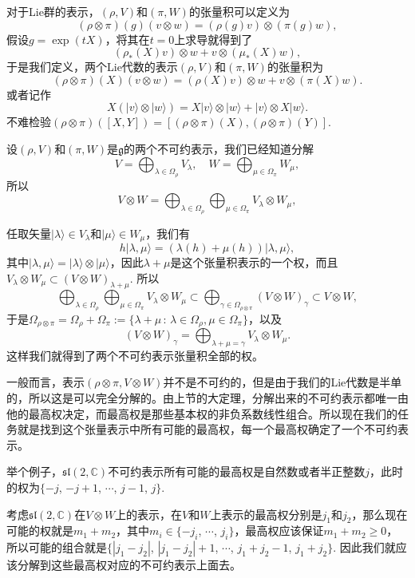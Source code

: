 \documentclass[10pt]{article}
\newcommand{\cc}{\mathbb{C}}
\newcommand{\lag}{{\mathfrak{g}}}
\begin{document}
对于Lie群的表示，$(\rho,V)$和$(\pi,W)$的张量积可以定义为
\[
	(\rho\otimes\pi)(g)(v\otimes w)=(\rho(g)v)\otimes(\pi(g)w),
\]
假设$g=\exp(tX)$，将其在$t=0$上求导就得到了
\[
	(\rho_*(X)v)\otimes w+ v \otimes (\mu_*(X)w),
\]
于是我们定义，两个Lie代数的表示$(\rho,V)$和$(\pi,W)$的张量积为
\[
	(\rho\otimes\pi)(X)(v\otimes w)=(\rho(X)v)\otimes w+ v \otimes (\pi(X)w).
\]
或者记作
\[
	X(|v\rangle\otimes|w\rangle)=X|v\rangle\otimes|w\rangle+|v\rangle\otimes X|w\rangle.
\]
不难检验$(\rho\otimes\pi)([X,Y])=[(\rho\otimes\pi)(X),(\rho\otimes\pi)(Y)]$.

\para 设$(\rho,V)$和$(\pi,W)$是$\lag$的两个不可约表示，我们已经知道分解
\[
	V=\bigoplus_{\lambda\in\Omega_\rho} V_\lambda,\quad W=\bigoplus_{\mu\in\Omega_\pi} W_\mu,
\]
所以
\[
	V\otimes W=\bigoplus_{\lambda\in\Omega_\rho}\bigoplus_{\mu\in\Omega_\pi} V_\lambda\otimes W_\mu,
\]

任取矢量$|\lambda\rangle\in V_\lambda$和$|\mu\rangle\in W_\mu$，我们有
\[
	h|\lambda,\mu\rangle=(\lambda(h)+\mu(h))|\lambda,\mu\rangle,
\]
其中$|\lambda,\mu\rangle=|\lambda\rangle\otimes |\mu\rangle$，因此$\lambda+\mu$是这个张量积表示的一个权，而且$V_\lambda\otimes W_\mu \subset (V\otimes W)_{\lambda+\mu}$. 所以
\[
	\bigoplus_{\lambda\in\Omega_\rho}\bigoplus_{\mu\in\Omega_\pi} V_\lambda\otimes W_\mu\subset \bigoplus_{\gamma\in \Omega_{\rho\otimes\pi}} (V\otimes W)_{\gamma}\subset V\otimes W,
\]
于是$\Omega_{\rho\otimes\pi}=\Omega_{\rho}+\Omega_{\pi}:=\{\lambda+\mu\,:\,\lambda\in\Omega_\rho,\mu\in\Omega_\pi\}$，以及
\[
	(V\otimes W)_{\gamma}=\bigoplus_{\lambda+\mu=\gamma}V_\lambda\otimes W_\mu.
\]
这样我们就得到了两个不可约表示张量积全部的权。

\para 一般而言，表示$(\rho\otimes\pi,V\otimes W)$并不是不可约的，但是由于我们的Lie代数是半单的，所以这是可以完全分解的。由上节的大定理，分解出来的不可约表示都唯一由他的最高权决定，而最高权是那些基本权的非负系数线性组合。所以现在我们的任务就是找到这个张量表示中所有可能的最高权，每一个最高权确定了一个不可约表示。

举个例子，$\mathfrak{sl}(2,\cc)$不可约表示所有可能的最高权是自然数或者半正整数$j$，此时的权为$\{-j$, $-j+1$, $\cdots$, $j-1$, $j\}$.

考虑$\mathfrak{sl}(2,\cc)$在$V\otimes W$上的表示，在$V$和$W$上表示的最高权分别是$j_1$和$j_2$，那么现在可能的权就是$m_1+m_2$，其中$m_i\in\{-j_i$, $\cdots$, $j_i\}$，最高权应该保证$m_1+m_2\geq 0$，所以可能的组合就是$\{|j_1-j_2|$, $|j_1-j_2|+1$, $\cdots$, $j_1+j_2-1$, $j_1+j_2\}$. 因此我们就应该分解到这些最高权对应的不可约表示上面去。
\end{document}

